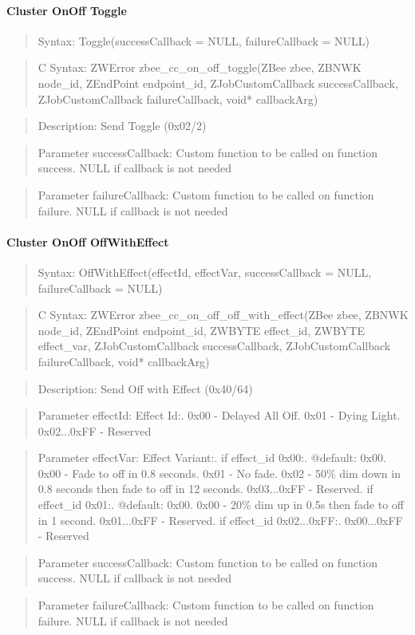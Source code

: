 \paragraph{Cluster OnOff Toggle}
\begin{quote}Syntax: Toggle(successCallback = NULL, failureCallback = NULL)\end{quote}
\begin{quote}C Syntax: ZWError zbee\_cc\_on\_off\_toggle(ZBee zbee, ZBNWK node\_id, ZEndPoint endpoint\_id, ZJobCustomCallback successCallback, ZJobCustomCallback failureCallback, void* callbackArg)\end{quote}
\begin{quote}Description: Send Toggle (0x02/2)\end{quote}
\begin{quote}Parameter successCallback: Custom function to be called on function success. NULL if callback is not needed\end{quote}
\begin{quote}Parameter failureCallback: Custom function to be called on function failure. NULL if callback is not needed\end{quote}


\paragraph{Cluster OnOff OffWithEffect}
\begin{quote}Syntax: OffWithEffect(effectId, effectVar, successCallback = NULL, failureCallback = NULL)\end{quote}
\begin{quote}C Syntax: ZWError zbee\_cc\_on\_off\_off\_with\_effect(ZBee zbee, ZBNWK node\_id, ZEndPoint endpoint\_id, ZWBYTE effect\_id, ZWBYTE effect\_var, ZJobCustomCallback successCallback, ZJobCustomCallback failureCallback, void* callbackArg)\end{quote}
\begin{quote}Description: Send Off with Effect (0x40/64)\end{quote}
\begin{quote}Parameter effectId: Effect Id:. 0x00        - Delayed All Off. 0x01        - Dying Light. 0x02...0xFF - Reserved\end{quote}
\begin{quote}Parameter effectVar: Effect Variant:. if effect\_id 0x00:. @default: 0x00. 0x00        - Fade to off in 0.8 seconds. 0x01        - No fade. 0x02        - 50\% dim down in 0.8 seconds then fade to off in 12 seconds. 0x03...0xFF - Reserved. if effect\_id 0x01:. @default: 0x00. 0x00        - 20\% dim up in 0.5s then fade to off in 1 second. 0x01...0xFF - Reserved. if effect\_id 0x02...0xFF:. 0x00...0xFF - Reserved\end{quote}
\begin{quote}Parameter successCallback: Custom function to be called on function success. NULL if callback is not needed\end{quote}
\begin{quote}Parameter failureCallback: Custom function to be called on function failure. NULL if callback is not needed\end{quote}


